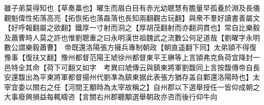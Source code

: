 雖子弟莫得知也【草奏藁也】曜生而眉白目有赤光幼聰慧有膽量早孤養於淵及長儀觀魁偉性拓落高亮【拓恢拓也落磊落也長知兩翻觀古玩翻】與衆不羣好讀書善屬文【好呼報翻屬之欲翻】鐵厚一寸射而洞之【厚胡茂翻射而亦翻洞貫也】常自比樂毅及蕭曹時人莫之許也惟劉聰重之曰永明漢世祖魏武之流數公何足道哉【劉曜字永明數公謂樂毅蕭曹】　帝既還洛陽張方擁兵專制朝政【朝直遥翻下同】太弟頴不得復豫事【復扶又翻】豫州都督范陽王虓徐州都督東平王楙等上言頴弗克負荷宜降封一邑特全其命【荷下可翻又如字　考異曰虓傳云與鎮東將軍劉馥同上言按馥傳帝自長安還馥出為平東將軍都督揚州代劉凖為鎮東据此表張方猶存盖自鄴還洛陽時也】太宰宜委以關右之任【河間王顒時為太宰故稱之】自州郡以下選舉授任一皆仰成朝之大事廢興損益每輒疇咨【言關右州郡聽顒選舉朝政亦咨而後行仰牛向
